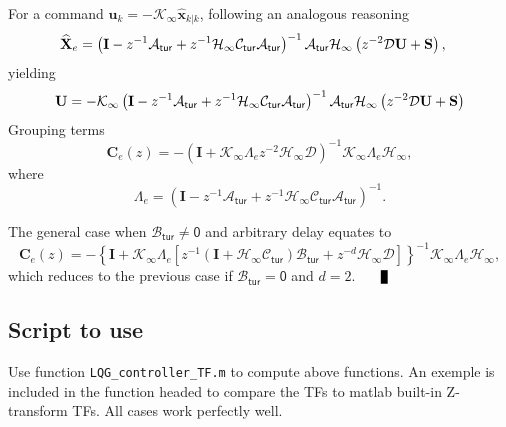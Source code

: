 \documentclass[a4paper,12pt]{article}
\newcommand{\0}{\mathsf{0}} %
\newcommand{\I}{\mathbf{I}} %
\newcommand{\Hkal}{\mathcal{H}_{\infty}} %
\newcommand{\K}{\mathcal{K}_{\infty}} %
\newcommand{\z}{{z}} %
\newcommand{\xz}{\text{\bf X}} %
\newcommand{\uz}{\text{\bf U}} %
\newcommand{\yz}{\text{\bf S}} %
\newcommand{\Ad}{\mathcal{A}_\mathsf{tur}} %
\newcommand{\Bd}{\mathcal{B}_\mathsf{tur}} %
\newcommand{\Cd}{\mathcal{C}_\mathsf{tur}} %
\newcommand{\xvec}{{\mathbf{x}}}
\newcommand{\uvec}{{\mathbf{u}}}
\newcommand{\qed}{\nobreak \ifvmode \relax \else
      \ifdim\lastskip<1.5em \hskip-\lastskip
      \hskip1.5em plus0em minus0.5em \fi \nobreak
      \vrule height0.75em width0.5em depth0.25em\fi}
\begin{document}
\begin{demo}
For a command $\uvec_k = -\K
  \widehat{\xvec}_{k|k}$, following an analogous reasoning 
  \begin{align}
    \widehat{\xz}_{e} & 
    = \left(\I - \z^{-1}\Ad + \z^{-1} \Hkal \Cd \Ad \right)^{-1}
    \Ad \Hkal \left( \z^{-2} \mathcal{D}  \uz +  \yz\right),
  \end{align}       
  yielding
  \begin{align}
    \uz = -\K \left(\I - \z^{-1}\Ad + \z^{-1} \Hkal \Cd \Ad \right)^{-1}
    \Ad \Hkal \left( \z^{-2} \mathcal{D}  \uz +  \yz\right)
  \end{align}
  Grouping terms
 \begin{equation}
    \mathbf{C}_e(\z)  = - \left(\I + \K \Lambda_{e} \z^{-2}\Hkal \mathcal{D}\right)^{-1} \K \Lambda_{e} \Hkal,
  \end{equation}
where 
  \begin{equation}
    \Lambda_{e} = \left(\I - \z^{-1}\Ad + \z^{-1} \Hkal \Cd \Ad \right)^{-1}.
  \end{equation}

The general case when  $\Bd \neq \0$ and arbitrary delay equates to
 \begin{equation}
    \mathbf{C}_e(\z)  = - \left\{\I + \K \Lambda_{e} \left[z^{-1}
        (\I+\Hkal\Cd) \Bd + \z^{-d}\Hkal\mathcal{D}\right] \right\}^{-1} \K \Lambda_{e} \Hkal,
  \end{equation}
which reduces to the previous case if  $\Bd = \0$ and $d=2$.
 $\qed$
\end{demo}

\subsection{Script to use }
Use function \verb+LQG_controller_TF.m+ to compute above functions. An
exemple is included in the function headed to compare the TFs to
matlab built-in Z-transform TFs. All cases work perfectly well.





{}
\end{document}
